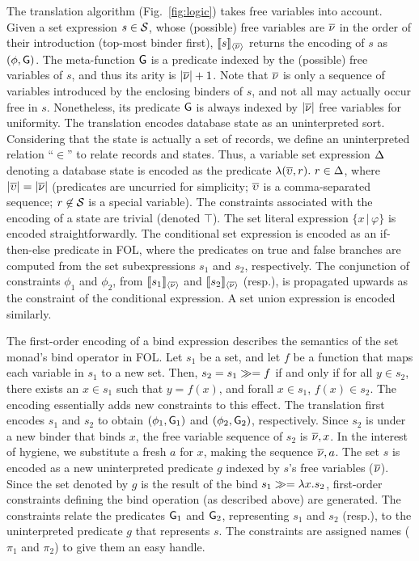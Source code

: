 The translation algorithm (Fig.~\ref{fig:logic}) takes free variables
into account. Given a set expression $s\in\mathcal{S}$, whose (possible) free
variables are $\overline{\nu}$ in the order of their introduction (top-most
binder first), $\llbracket s \rrbracket_{\langle \overline{\nu} \rangle}$ returns the encoding of $s$ as
$(\phi,{\sf G})$.  The meta-function ${\sf G}$ is a predicate indexed by the
(possible) free variables of $s$, and thus its arity is $|\overline{\nu}| + 1$.
Note that $\overline{\nu}$ is only a sequence of variables introduced by the
enclosing binders of $s$, and not all may actually occur free in $s$.
Nonetheless, its predicate ${\sf G}$ is always indexed by $|\overline{\nu}|$ free
variables for uniformity. The translation encodes database state as an
uninterpreted sort. Considering that the state is actually a set of
records, we define an uninterpreted relation ``$\in$'' to relate records
and states. Thus, a variable set expression $\Delta$ denoting a database
state is encoded as the predicate $\lambda (\overline{\upsilon},r).~r\in\Delta$, where
$|\overline{\upsilon}|=|\overline{\nu}|$ (predicates are uncurried for simplicity; $\overline{\upsilon}$
is a comma-separated sequence; $r\not\in\mathcal{S}$ is a special variable).
The constraints associated with the encoding of a state are trivial
(denoted $\top$). The set literal expression $\{x\,|\, \varphi\}$ is encoded
straightforwardly. The conditional set expression is encoded as an
if-then-else predicate in FOL, where the predicates on true and false
branches are computed from the set subexpressions $s_1$ and $s_2$,
respectively. The conjunction of constraints $\phi_1$ and $\phi_2$,
from $\llbracket s_1 \rrbracket_{\langle \overline{\nu} \rangle}$ and $\llbracket s_2 \rrbracket_{\langle \overline{\nu} \rangle}$ (resp.), is
propagated upwards as the constraint of the conditional expression.
A set union expression is encoded similarly.

The first-order encoding of a bind expression describes the semantics
of the set monad's bind operator in FOL. Let $s_1$ be a set, and let
$f$ be a function that maps each variable in $s_1$ to a new set. Then,
$s_2 = s_1 \gg= f$ if and only if for all $y\in s_2$, there exists an
$x \in s_1$ such that $y = f(x)$, and forall $x\in s_1$, $f(x)\in
s_2$. The encoding essentially adds new constraints to this effect.
The translation first encodes $s_1$ and $s_2$ to obtain
$(\phi_1,{\sf G}_1)$ and $(\phi_2,{\sf G}_2)$, respectively. Since $s_2$ is
under a new binder that binds $x$, the free variable sequence of $s_2$
is $\overline{\nu},x$. In the interest of hygiene, we substitute a fresh $a$
for $x$, making the sequence $\overline{\nu},a$. The set $s$ is encoded as a
new uninterpreted predicate $g$ indexed by $s$'s free variables
($\overline{\nu}$). Since the set denoted by $g$ is the result of the bind
$s_1 \gg= \lambda x.s_2$, first-order constraints defining the bind
operation (as described above) are generated. The constraints relate
the predicates ${\sf G}_1$ and ${\sf G}_2$, representing $s_1$ and $s_2$
(resp.), to the uninterpreted predicate $g$ that represents $s$. The
constraints are assigned names ($\pi_1$ and $\pi_2$) to give them an
easy handle.

